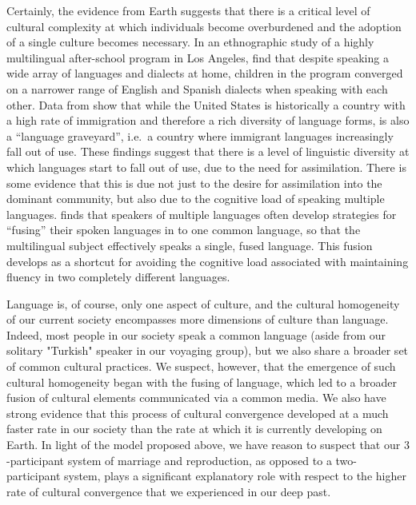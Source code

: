 \documentclass{report}
\begin{document}
Certainly, the evidence from Earth suggests that there is a critical level of cultural complexity at which individuals become overburdened and the adoption of a single culture becomes necessary. In an ethnographic study of a highly multilingual after-school program in Los Angeles, \cite{orellana2016cultivating} find that despite speaking a wide array of languages and dialects at home, children in the program converged on a narrower range of English and Spanish dialects when speaking with each other. Data from \cite{rumbaut2013immigration} show that while the United States is historically a country with a high rate of immigration and therefore a rich diversity of language forms, is also a ``language graveyard'', i.e.\ a country where immigrant languages increasingly fall out of use. These findings suggest that there is a level of linguistic diversity at which languages start to fall out of use, due to the need for assimilation. There is some evidence that this is due not just to the desire for assimilation into the dominant community, but also due to the cognitive load of speaking multiple languages. \cite{matras2000fusion}
finds that speakers of multiple languages often develop strategies for ``fusing'' their spoken languages in to one common language, so that the multilingual subject effectively speaks a single, fused language. This fusion develops as a shortcut for avoiding the cognitive load associated with maintaining fluency in two completely different languages.\par 





Language is, of course, only one aspect of culture, and the cultural homogeneity of our current society encompasses more dimensions of culture than language. Indeed, most people in our society speak a common language (aside from our solitary "Turkish" speaker in our voyaging group), but we also share a broader set of common cultural practices. We suspect, however, that the emergence of such cultural homogeneity began with the fusing of language, which led to a broader fusion of cultural elements communicated via a common media. We also have strong evidence that this process of cultural convergence developed at a much faster rate in our society than the rate at which it is currently developing on Earth. In light of the model proposed above, we have reason to suspect that our $3$-participant system of marriage and reproduction, as opposed to a two-participant system, plays a significant explanatory role with respect to the higher rate of cultural convergence that we experienced in our deep past.\par 
\end{document}
